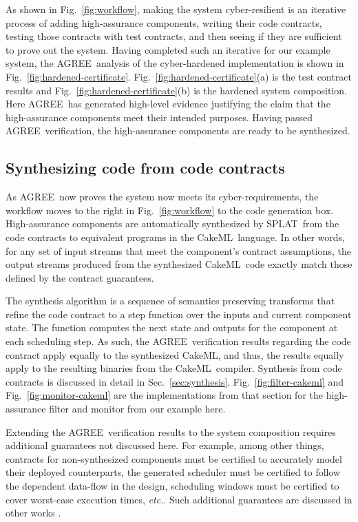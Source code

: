 \documentclass[global,twocolumn]{svjour}
\newcommand{\figref}[1]{Fig.~\ref{#1}}
\newcommand{\secref}[1]{Sec.~\ref{#1}}
\newcommand{\agr}{AGREE}
\newcommand{\splt}{SPLAT}
\newcommand{\ckml}{CakeML}
\newcommand{\etc}{\textit{etc.}}
\begin{document}
As shown in \figref{fig:workflow}, making the system cyber-resilient is an iterative process of adding high-assurance components, writing their code contracts, testing those contracts with test contracts, and then seeing if they are sufficient to prove out the system.
%
Having completed such an iterative for our example system, the \agr\ analysis of the cyber-hardened implementation is shown in \figref{fig:hardened-certificate}.
%
\figref{fig:hardened-certificate}(a) is the test contract results and \figref{fig:hardened-certificate}(b) is the hardened system composition.
%
Here \agr\ has generated high-level evidence justifying the claim that the high-assurance components meet their intended purposes.
%
Having passed \agr\ verification, the high-assurance components are ready to be synthesized.

%
\subsection{Synthesizing code from code contracts}

As \agr\ now proves the system now meets its cyber-requirements, the workflow moves to the right in \figref{fig:workflow} to the code generation box.
%
High-assurance components are automatically synthesized by \splt\ from the code contracts to equivalent programs in the \ckml\ language.
%
In other words, for any set of input streams that meet the component's contract assumptions, the output streams produced from the synthesized \ckml\ code exactly match those defined by the contract guarantees.

The synthesis algorithm is a sequence of semantics preserving transforms that refine the code contract to a step function over the inputs and current component state. The function computes the next state and outputs for the component at each scheduling step.
%
As such, the \agr\ verification results regarding the code contract apply equally to the synthesized \ckml, and thus, the results equally apply to the resulting binaries from the \ckml\ compiler.
%
Synthesis from code contracts is discussed in detail in \secref{sec:synthesis}.
%
\figref{fig:filter-cakeml} and \figref{fig:monitor-cakeml} are the implementations from that section for the high-assurance filter and monitor from our example here.


Extending the \agr\ verification results to the system composition requires additional guarantees not discussed here.
%
For example, among other things, contracts for non-synthesized components must be certified to accurately model their deployed counterparts, the generated scheduler must be certified to follow the dependent data-flow in the design, scheduling windows must be certified to cover worst-case execution times, \etc.
%
Such additional guarantees are discussed in other works \cite{gearcase2020, dcrypps2019, 10.1007/978-3-030-89159-6_18, 10.1007/978-3-030-89159-6_17, sel4-2009, nfm:agree, 9734792}.
\end{document}
